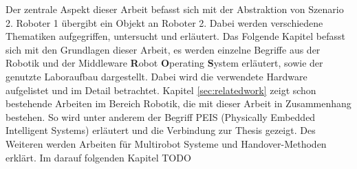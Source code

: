 Der zentrale Aspekt dieser Arbeit befasst sich mit der Abstraktion von Szenario 2. Roboter 1 übergibt ein Objekt an Roboter 2. Dabei werden verschiedene Thematiken aufgegriffen, untersucht und erläutert. Das Folgende Kapitel befasst sich mit den Grundlagen dieser Arbeit, es werden einzelne Begriffe aus der Robotik und der Middleware \textbf{R}obot \textbf{O}perating \textbf{S}ystem erläutert, sowie der genutzte Laboraufbau dargestellt. Dabei wird die verwendete Hardware aufgelistet und im Detail betrachtet. Kapitel \ref{sec:relatedwork} zeigt schon bestehende Arbeiten im Bereich Robotik, die mit dieser Arbeit in Zusammenhang bestehen. So wird unter anderem der Begriff PEIS (Physically Embedded Intelligent Systems) erläutert und die Verbindung zur Thesis gezeigt. Des Weiteren werden Arbeiten für Multirobot Systeme und Handover-Methoden erklärt. Im darauf folgenden Kapitel TODO




